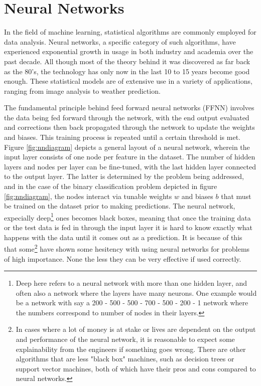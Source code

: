 \section{Neural Networks}
In the field of machine learning, statistical algorithms are commonly employed for data analysis. 
Neural networks, a specific category of such algorithms, have experienced exponential growth in 
usage in both industry and academia over the past decade. All though most of the theory behind it was 
discovered as far back as the 80's, the technology has only now in the last 10 to 15 years become good enough. 
These statistical models are of extensive use in a variety of applications, ranging from image analysis to 
weather prediction. \par 
The fundamental principle behind feed forward neural networks (FFNN) involves the 
data being fed forward through the network, with the end output evaluated and corrections then back 
propagated through the network to update the weights and biases. This training process is repeated 
until a certain threshold is met. Figure \ref{fig:nndiagram} depicts a general layout of a neural 
network, wherein the input layer consists of one node per feature in the dataset. The number of 
hidden layers and nodes per layer can be fine-tuned, with the last hidden layer connected to the 
output layer. The latter is determined by the problem being addressed, and in the case of the 
binary classification problem depicted in figure \ref{fig:nndiagram}, the nodes interact via 
tunable weights $w$ and biases $b$ that must be trained on the dataset prior to making predictions.
The neural network, expecially deep\footnote{Deep here refers to a neural network with more than 
one hidden layer, and often also a network where the layers have many neurons. One example would be a network with say a 
200 - 500 - 500 - 700 - 500 - 200 - 1 network where the numbers correspond to number of nodes in their layers.} 
ones becomes black boxes, meaning that once the training data or the test data is fed in through 
the input layer it is hard to know exactly what happens with the data until it comes out as a 
prediction. It is because of this that some\footnote{In cases where a lot of money is at stake or 
lives are dependent on the output and performance of the neural network, it is reasonable to expect 
some explainability from the engineers if something goes wrong. There are other algorithms that are less 
"black box" machines, such as decision trees\cite{Chen_2016} or support vector machines\cite{cortes1995support}, 
both of which have their pros and cons compared to neural networks.} have shown some hesitency 
with using neural networks for problems of high importance. None the less they can be very 
effective if used correctly. 

